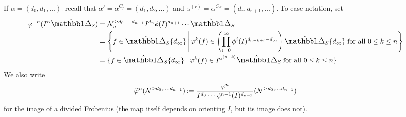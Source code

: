 \begin{notation}
  If $\alpha=(d_0,d_1,\dotsc)$, recall that $\alpha'=\alpha^{C_p}=(d_1,d_2,\dotsc)$ and $\alpha^{(r)}=\alpha^{C_{p^r}}=(d_r,d_{r+1},\dotsc)$. To ease notation, set
  \begin{align*}
    \varphi^{-n}(I^\alpha\prismcpl_S)
      &= \Nyg^{\ge d_0,\dotsc,d_{n-1}}_n I^{d_n} \phi(I)^{d_{n+1}}\dotsm\prismcpl_S\\
      &= \left\{f \in \prismcpl_S\{d_\infty\} \,\middle|\, \varphi^k(f) \in \left(\prod_{i=0}^\infty \phi^i(I)^{d_{n-k+i}-d_\infty}\right)\prismcpl_S\{d_\infty\} \text{ for all } 0\le k\le n\right\}\\
      &= \{f\in\prismcpl_S\{d_\infty\} \mid \varphi^k(f) \in I^{\alpha^{(n-k)}}\prismcpl_S \text{ for all }0\le k\le n\}
  \end{align*}
  We also write
  \[ \widetilde\varphi^n(\mathcal N^{\ge d_0,\dotsc,d_{n-1}}) \mathrel{:=} \frac{\varphi^n}{I^{d_0}\dotsm \phi^{n-1}(I)^{d_{n-1}}}(\mathcal N^{\ge d_0,\dotsc,d_{n-1}}) \]
  for the image of a divided Frobenius (the map itself depends on orienting $I$, but its image does not).
\end{notation}

